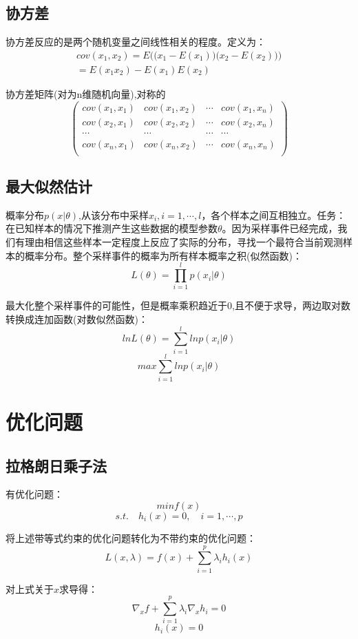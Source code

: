 \documentclass[UTF8]{ctexart} %
\begin{document}
		\subsection{协方差}
		协方差反应的是两个随机变量之间线性相关的程度。定义为：
		\[\begin{aligned}
			cov(x_1,x_2)= E\Big(\big(x_1-E(x_1)\big)\big(x_2-E(x_2)\big)\Big)\\
			=E(x_1x_2)-E(x_1)E(x_2)
		\end{aligned}\]
		
		协方差矩阵(对为n维随机向量),对称的
		\[\begin{pmatrix}
			cov(x_1,x_1)&cov(x_1,x_2)&\cdots&cov(x_1,x_n)\\
			cov(x_2,x_1)&cov(x_2,x_2)&\cdots&cov(x_2,x_n)\\
			\cdots&\cdots&\cdots&\cdots\\
			cov(x_n,x_1)&cov(x_n,x_2)&\cdots&cov(x_n,x_n)\\
		\end{pmatrix}\]
		
		\subsection{最大似然估计}
		概率分布$p(x|\theta)$,从该分布中采样$x_i,i=1,\cdots,l$，各个样本之间互相独立。任务：在已知样本的情况下推测产生这些数据的模型参数$\theta$。因为采样事件已经完成，我们有理由相信这些样本一定程度上反应了实际的分布，寻找一个最符合当前观测样本的概率分布。整个采样事件的概率为所有样本概率之积(似然函数)：
		\[L(\theta)=\prod_{i=1}^l p(x_i|\theta)\]
		
		最大化整个采样事件的可能性，但是概率乘积趋近于0,且不便于求导，两边取对数转换成连加函数(对数似然函数)：
		\[lnL(\theta) = \sum_{i=1}^l lnp(x_i|\theta)\]
		\[max \sum_{i=1}^l lnp(x_i|\theta)\]
		
		\section{优化问题}
		\subsection{拉格朗日乘子法}
		有优化问题：
		\[minf(x)\]
		\[s.t.\quad h_i(x)=0,\quad i=1,\cdots,p\]
		
		将上述带等式约束的优化问题转化为不带约束的优化问题：
		\[L(x,\lambda) = f(x) + \sum_{i=1}^p \lambda_i h_i(x) \]
		
		对上式关于$x$求导得：
		\[ \nabla_xf + \sum_{i=1}^{p} \lambda_i\nabla_xh_i=0  \]
		\[ h_i(x)=0 \]

	
		
		
	
	
\end{document}

